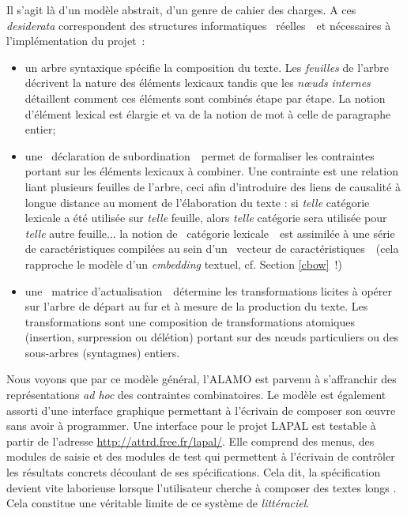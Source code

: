 \documentclass{article}
\begin{document}
					\vspace{2mm}
					Il s'agit là d'un modèle abstrait, d'un genre de cahier des charges. A ces \textit{desiderata} correspondent des structures informatiques \guillemotleft~réelles~\guillemotright~et nécessaires à l'implémentation du projet~:
					\vspace{2mm}
					\begin{itemize}
						\item un arbre syntaxique spécifie la composition du texte. Les \textit{feuilles} de l'arbre décrivent la nature des éléments lexicaux tandis que les \textit{nœuds internes} détaillent comment ces éléments sont combinés étape par étape. La notion d'élément lexical est élargie et va de la notion de mot à celle de paragraphe entier;
						\item une \guillemotleft~déclaration de subordination~\guillemotright~permet de formaliser les contraintes portant sur les éléments lexicaux à combiner. Une contrainte est une relation liant plusieurs feuilles de l'arbre, ceci afin d'introduire des liens de causalité à longue distance au moment de l'élaboration du texte : si \textit{telle} catégorie lexicale a été utilisée sur \textit{telle} feuille, alors \textit{telle} catégorie sera utilisée pour \textit{telle} autre feuille... la notion de \guillemotleft~catégorie lexicale~\guillemotright~est assimilée à une série de caractéristiques compilées au sein d'un \guillemotleft~vecteur de caractéristiques~\guillemotright~(cela rapproche le modèle d'un \textit{embedding} textuel, cf. Section \ref{cbow}~!)
						\item une \guillemotleft~matrice d'actualisation~\guillemotright~détermine les transformations licites à opérer sur l'arbre de départ au fur et à mesure de la production du texte. Les transformations sont une composition de transformations atomiques (insertion, surpression ou délétion) portant sur des nœuds particuliers ou des sous-arbres (syntagmes) entiers.
					\end{itemize}
					\vspace{2mm} 
					Nous voyons que par ce modèle général, l'ALAMO est parvenu à s'affranchir des représentations \textit{ad hoc} des contraintes combinatoires. Le modèle est également assorti d'une interface graphique permettant à l'écrivain de composer son œuvre sans avoir à programmer. Une interface pour le projet LAPAL est testable à partir de l'adresse \href{http://attrd.free.fr/lapal/}{http://attrd.free.fr/lapal/}. Elle comprend des menus, des modules de saisie et des modules de test qui permettent à l'écrivain de contrôler les résultats concrets découlant de ses spécifications. Cela dit, la spécification devient vite laborieuse lorsque l'utilisateur cherche à composer des textes longs \autocite{alamo}. Cela constitue une véritable limite de ce système de \textit{littéraciel}.\\
					
\end{document}

